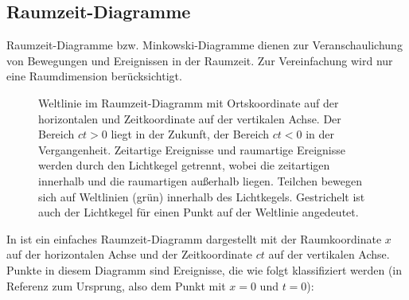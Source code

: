 \subsection{Raumzeit-Diagramme}

Raumzeit-Diagramme bzw. Minkowski-Diagramme dienen zur Veranschaulichung von Bewegungen und Ereignissen in der Raumzeit.
Zur Vereinfachung wird nur eine Raumdimension berücksichtigt.

\begin{figure}[htp]
    \centering
    \tfigMinkowskiDiagramA
    \caption{Weltlinie im Raumzeit-Diagramm mit Ortskoordinate auf der horizontalen und Zeitkoordinate auf der vertikalen Achse.
        Der Bereich $ct>0$ liegt in der Zukunft, der Bereich $ct<0$ in der Vergangenheit.
        Zeitartige Ereignisse und raumartige Ereignisse werden durch den Lichtkegel getrennt, wobei die zeitartigen innerhalb und die raumartigen außerhalb liegen.
        Teilchen bewegen sich auf Weltlinien (grün) innerhalb des Lichtkegels. Gestrichelt ist auch der Lichtkegel für einen Punkt auf der Weltlinie angedeutet. }
    \label{fig:minkowski_diagram}
\end{figure}

In  ist ein einfaches Raumzeit-Diagramm dargestellt mit der Raumkoordinate $x$ auf der horizontalen Achse und der Zeitkoordinate $ct$ auf der vertikalen Achse.
Punkte in diesem Diagramm sind Ereignisse, die wie folgt klassifiziert werden (in Referenz zum Ursprung, also dem Punkt mit $x=0$ und $t=0$):

